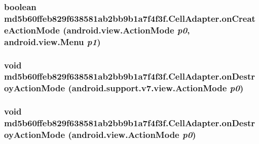 \hypertarget{classmd5b60ffeb829f638581ab2bb9b1a7f4f3f_1_1_cell_adapter_4a8ad9014d454fbe0396726ba6b20b4b}{
\subsubsection[{onCreateActionMode}]{\setlength{\rightskip}{0pt plus 5cm}boolean md5b60ffeb829f638581ab2bb9b1a7f4f3f.CellAdapter.onCreateActionMode (android.view.ActionMode {\em p0}, \/  android.view.Menu {\em p1})}}
\label{classmd5b60ffeb829f638581ab2bb9b1a7f4f3f_1_1_cell_adapter_4a8ad9014d454fbe0396726ba6b20b4b}


\hypertarget{classmd5b60ffeb829f638581ab2bb9b1a7f4f3f_1_1_cell_adapter_8d6a0075be883243c54327d203a8d575}{
\subsubsection[{onDestroyActionMode}]{\setlength{\rightskip}{0pt plus 5cm}void md5b60ffeb829f638581ab2bb9b1a7f4f3f.CellAdapter.onDestroyActionMode (android.support.v7.view.ActionMode {\em p0})}}
\label{classmd5b60ffeb829f638581ab2bb9b1a7f4f3f_1_1_cell_adapter_8d6a0075be883243c54327d203a8d575}


\hypertarget{classmd5b60ffeb829f638581ab2bb9b1a7f4f3f_1_1_cell_adapter_2c4b1f2ec74b292e21fd9c665ba8ee1d}{
\subsubsection[{onDestroyActionMode}]{\setlength{\rightskip}{0pt plus 5cm}void md5b60ffeb829f638581ab2bb9b1a7f4f3f.CellAdapter.onDestroyActionMode (android.view.ActionMode {\em p0})}}
\label{classmd5b60ffeb829f638581ab2bb9b1a7f4f3f_1_1_cell_adapter_2c4b1f2ec74b292e21fd9c665ba8ee1d}


